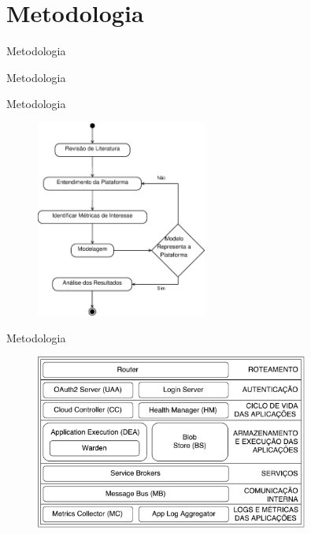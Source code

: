 \documentclass{beamer}
\begin{document}

\section{Metodologia}

    \begin{frame}{Metodologia}
        \Huge{\centerline{Metodologia}}
    \end{frame}

    \begin{frame}{Metodologia}

        \begin{figure}[ht]
            \includegraphics[width=0.50\textwidth]{img/metodos.eps}
        \end{figure}

    \end{frame}

    \begin{frame}{Metodologia}

        \begin{figure}[ht]
            \includegraphics[width=0.80\textwidth]{img/arr_cf.pdf}
        \end{figure}

    \end{frame}    
\end{document}
